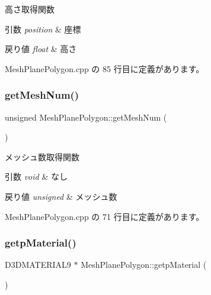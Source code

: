 高さ取得関数 


\begin{DoxyParams}{引数}
{\em position} & 座標 \\
\hline
\end{DoxyParams}

\begin{DoxyRetVals}{戻り値}
{\em float} & 高さ \\
\hline
\end{DoxyRetVals}


 Mesh\+Plane\+Polygon.\+cpp の 85 行目に定義があります。

\mbox{\label{class_mesh_plane_polygon_a1850ae9039b99d29b709b17224b49fa5}} 
\subsubsection{\texorpdfstring{get\+Mesh\+Num()}{getMeshNum()}}
{\footnotesize\ttfamily unsigned Mesh\+Plane\+Polygon\+::get\+Mesh\+Num (\begin{DoxyParamCaption}{ }\end{DoxyParamCaption})}



メッシュ数取得関数 


\begin{DoxyParams}{引数}
{\em void} & なし \\
\hline
\end{DoxyParams}

\begin{DoxyRetVals}{戻り値}
{\em unsigned} & メッシュ数 \\
\hline
\end{DoxyRetVals}


 Mesh\+Plane\+Polygon.\+cpp の 71 行目に定義があります。

\mbox{\label{class_mesh_plane_polygon_a77860c05db625178d9063edced585c3f}} 
\subsubsection{\texorpdfstring{getp\+Material()}{getpMaterial()}}
{\footnotesize\ttfamily D3\+D\+M\+A\+T\+E\+R\+I\+A\+L9 $\ast$ Mesh\+Plane\+Polygon\+::getp\+Material (\begin{DoxyParamCaption}{ }\end{DoxyParamCaption})}



